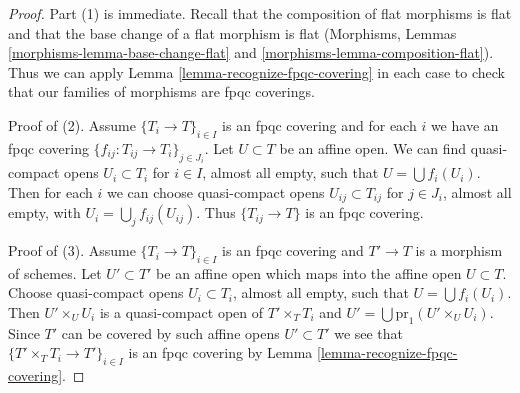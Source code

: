 \documentclass[10pt,a4paper]{amsart}
\theoremstyle{plain}
\theoremstyle{definition}
\theoremstyle{remark}
\numberwithin{equation}{subsection}
\begin{document}
\begin{proof}
Part (1) is immediate. Recall that the composition of flat morphisms
is flat and that the base change of a flat morphism is flat
(Morphisms, Lemmas \ref{morphisms-lemma-base-change-flat} and
\ref{morphisms-lemma-composition-flat}).
Thus we can apply Lemma \ref{lemma-recognize-fpqc-covering}
in each case to check that our families of morphisms are fpqc coverings.

\medskip\noindent
Proof of (2). Assume $\{T_i \to T\}_{i\in I}$ is an fpqc covering and for each
$i$ we have an fpqc covering $\{f_{ij} : T_{ij} \to T_i\}_{j\in J_i}$.
Let $U \subset T$ be an affine open. We can find
quasi-compact opens $U_i \subset T_i$ for $i \in I$, almost all empty,
such that $U = \bigcup f_i(U_i)$. Then for each $i$ we can choose
quasi-compact opens $U_{ij} \subset T_{ij}$ for $j \in J_i$, almost all empty,
with $U_i = \bigcup_j f_{ij}(U_{ij})$. Thus
$\{T_{ij} \to T\}$ is an fpqc covering.

\medskip\noindent
Proof of (3). Assume $\{T_i \to T\}_{i\in I}$ is an fpqc covering
and $T' \to T$ is a morphism of schemes. Let $U' \subset T'$ be an affine
open which maps into the affine open $U \subset T$. Choose
quasi-compact opens $U_i \subset T_i$, almost all empty,
such that $U = \bigcup f_i(U_i)$. Then $U' \times_U U_i$ is
a quasi-compact open of $T' \times_T T_i$ and
$U' = \bigcup \text{pr}_1(U' \times_U U_i)$. Since $T'$
can be covered by such affine opens $U' \subset T'$ we see
that $\{T' \times_T T_i \to T'\}_{i\in I}$ is an fpqc covering by
Lemma \ref{lemma-recognize-fpqc-covering}.
\end{proof}
\end{document}

